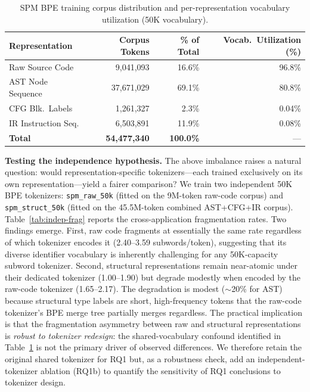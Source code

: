 \documentclass[pdflatex,sn-mathphys,Numbered]{sn-jnl}
\begin{document}
\begin{table}[tb]
\centering
\caption{SPM BPE training corpus distribution and per-representation vocabulary utilization (50K vocabulary).}\label{tab:vocab-dist}
\begin{tabular}{lrrr}
\toprule
Representation & Corpus Tokens & \% of Total & Vocab.\ Utilization (\%) \\
\midrule
Raw Source Code & 9,041,093 & 16.6\% & 96.8\% \\
AST Node Sequence& 37,671,029 & 69.1\% & 80.8\% \\
CFG Blk.\ Labels  & 1,261,327 & 2.3\% & 0.04\% \\
IR Instruction Seq.& 6,503,891 & 11.9\% & 0.08\% \\
\midrule
\textbf{Total} & \textbf{54,477,340} & \textbf{100.0\%} & --- \\
\bottomrule
\end{tabular}
\end{table}

\textbf{Testing the independence hypothesis.} The above imbalance raises a natural question: would representation-specific tokenizers---each trained exclusively on its own representation---yield a fairer comparison? We train two independent 50K BPE tokenizers: \texttt{spm\_raw\_50k} (fitted on the 9M-token raw-code corpus) and \texttt{spm\_struct\_50k} (fitted on the 45.5M-token combined AST+CFG+IR corpus). Table~\ref{tab:indep-frag} reports the cross-application fragmentation rates. Two findings emerge. First, raw code fragments at essentially the same rate regardless of which tokenizer encodes it (2.40--3.59 subwords/token), suggesting that its diverse identifier vocabulary is inherently challenging for any 50K-capacity subword tokenizer. Second, structural representations remain near-atomic under their dedicated tokenizer (1.00--1.90) but degrade modestly when encoded by the raw-code tokenizer (1.65--2.17). The degradation is modest ($\sim$20\% for AST) because structural type labels are short, high-frequency tokens that the raw-code tokenizer's BPE merge tree partially merges regardless. The practical implication is that the fragmentation asymmetry between raw and structural representations is \emph{robust to tokenizer redesign}: the shared-vocabulary confound identified in Table~\ref{tab:vocab-dist} is not the primary driver of observed differences. We therefore retain the original shared tokenizer for RQ1 but, as a robustness check, add an independent-tokenizer ablation (RQ1b) to quantify the sensitivity of RQ1 conclusions to tokenizer design.
\end{document}
